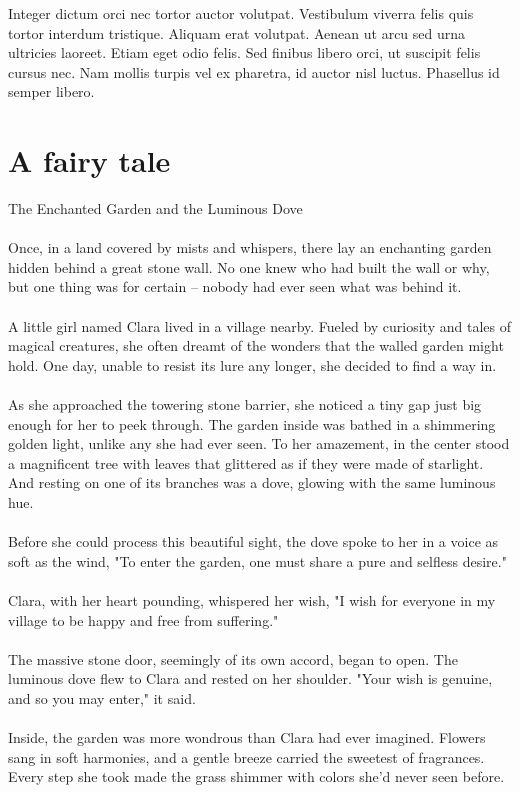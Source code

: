 \documentclass[10pt, fullpage, a4paper, titlepage]{article}
\begin{document}
Integer dictum orci nec tortor auctor volutpat. Vestibulum viverra felis quis tortor interdum tristique. Aliquam erat volutpat. Aenean ut arcu sed urna ultricies laoreet. Etiam eget odio felis. Sed finibus libero orci, ut suscipit felis cursus nec. Nam mollis turpis vel ex pharetra, id auctor nisl luctus. Phasellus id semper libero.

\section{A fairy tale}

The Enchanted Garden and the Luminous Dove
\\~\\
Once, in a land covered by mists and whispers, there lay an enchanting garden hidden behind a great stone wall. No one knew who had built the wall or why, but one thing was for certain – nobody had ever seen what was behind it.
\\~\\
A little girl named Clara lived in a village nearby. Fueled by curiosity and tales of magical creatures, she often dreamt of the wonders that the walled garden might hold. One day, unable to resist its lure any longer, she decided to find a way in.
\\~\\
As she approached the towering stone barrier, she noticed a tiny gap just big enough for her to peek through. The garden inside was bathed in a shimmering golden light, unlike any she had ever seen. To her amazement, in the center stood a magnificent tree with leaves that glittered as if they were made of starlight. And resting on one of its branches was a dove, glowing with the same luminous hue.
\\~\\
Before she could process this beautiful sight, the dove spoke to her in a voice as soft as the wind, "To enter the garden, one must share a pure and selfless desire."
\\~\\
Clara, with her heart pounding, whispered her wish, "I wish for everyone in my village to be happy and free from suffering."
\\~\\
The massive stone door, seemingly of its own accord, began to open. The luminous dove flew to Clara and rested on her shoulder. "Your wish is genuine, and so you may enter," it said.
\\~\\
Inside, the garden was more wondrous than Clara had ever imagined. Flowers sang in soft harmonies, and a gentle breeze carried the sweetest of fragrances. Every step she took made the grass shimmer with colors she'd never seen before.
\end{document}

